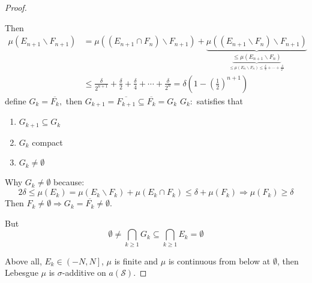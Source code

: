 \begin{proof}
\begin{enumerate}
		Then 
		\begin{equation}
		\begin{split}
		\mu \left( {{E_{n + 1}}\backslash {F_{n + 1}}} \right) & = \mu \left( {\left( {{E_{n + 1}} \cap {F_n}} \right)\backslash {F_{n + 1}}} \right) + \underbrace {\mu \left( {\left( {{E_{n + 1}}\backslash {F_n}} \right)\backslash {F_{n + 1}}} \right)}_{\underbrace { \leqslant \mu \left( {{E_{n + 1}}\backslash {F_n}} \right)}_{ \leqslant \mu \left( {{E_n}\backslash {F_n}} \right) \leqslant \frac{\delta }{2} +  \cdots  + \frac{\delta }{{{2^n}}} }}\\
														       & \le \frac{\delta }{{{2^{n + 1}}}} + \frac{\delta }{2} + \frac{\delta }{4} +  \cdots  + \frac{\delta }{{{2^n}}} = \delta \left( {1 - {{\left( {\frac{1}{2}} \right)}^{n + 1}}} \right)
		\end{split}
		\label{eq7.16}
		\end{equation}
		define ${G_k} = \overline {{F_k}} ,$ then ${G_{k + 1}} = \overline {{F_{k + 1}}}  \subseteq \overline {{F_k}}  = {G_k}$
		    $ G_{k}: $ satisfies that 
		\begin{enumerate}
			\item ${G_{k + 1}} \subseteq {G_k}$
			\item $ G_{k}$  compact
			\item $  {G_k} \neq \emptyset $
		\end{enumerate}
		
		Why $  {G_k} \neq \emptyset $ because:
		\begin{equation}
		2\delta  \leqslant \mu \left( {{E_k}} \right) = \mu \left( {{E_k}\backslash {F_k}} \right) + \mu \left( {{E_k} \cap {F_k}} \right) \leqslant \delta  + \mu \left( {{F_k}} \right) \Rightarrow \mu \left( {{F_k}} \right) \ge  \delta 
		\label{eq7.17}
		\end{equation}
		Then ${F_k} \ne \emptyset  \Rightarrow {G_k} = \overline {{F_k}}  \ne \emptyset $.
	\end{enumerate}
	But
	\begin{equation}
	\emptyset  \ne \bigcap\limits_{k \geqslant 1} {{G_k}}  \subseteq \bigcap\limits_{k \geqslant 1} {{E_k}}  = \emptyset 
	\label{eq7.18}
	\end{equation}
	
	Above all, ${E_k} \in \left( { - N,N} \right]$, $ \mu $ is finite and $ \mu  $ is continuous from below at $ \emptyset $, then Lebesgue $\mu $ is $ \sigma $-additive on $ a(\mathcal{S}) $.
\end{proof}

